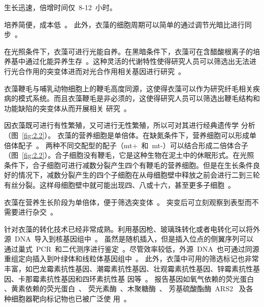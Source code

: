 \begin{asparaitem}[\DiamondSolid]
\item 生长迅速，倍增时间仅\ 8-12\ 小时\citep{Blaby2014}。

\item 培养简便，成本低\ \citep{Sager1953,Harris1989,Flowers2015}。 此外，衣藻的细胞周期可以简单的通过调节光暗比进行同步\ \citep{Blaby2014,Hlavova2016}。

\item 在光照条件下，衣藻可进行光能自养。在黑暗条件下，衣藻可在含醋酸根离子的培养基中通过化能异养生存\ \citep{Blaby2014,Flowers2015}。这种灵活的代谢特性使得研究人员可以筛选出无法进行光合作用的突变体进而对光合作用相关基因进行研究\ \citep{Jinkerson2015}。

\item 衣藻鞭毛与哺乳动物细胞上的鞭毛高度同源，这使得衣藻可以作为研究纤毛相关疾病的模式系统。而且衣藻鞭毛是非必须的，这使得研究人员可以筛选出鞭毛结构和功能缺陷的突变体从而开展相关
    研究\ \citep{Blaby2014}。

\item 因衣藻既可进行有性繁殖，又可进行无性繁殖，所以可对其进行经典遗传学
    分析\ \citep{Kates1964,Flowers2015} （图\ \ref{fig:2.2}）。 衣藻的营养细胞是单倍体。在缺氮条件下，营养细胞可以形成单倍体配子\ \citep{Gallaher2015}。 两种不同交配型的配子（mt+\ 和\ mt-）可以结合形成二倍体合子（图\ \ref{fig:2.2}）。合子细胞没有鞭毛，它是这种生物在泥土中的休眠形式。在光照条件下，合子细胞可进行减数分裂产生四个有鞭毛的营养细胞。但是在生长条件良好的情况下，减数分裂产生的四个子细胞在从母细胞壁中释放之前会进行二到三轮有丝分裂。这样母细胞壁中就可能出现四、八或十六，甚至更多子细胞\ \citep{Jinkerson2015}。

\item 衣藻在营养生长阶段为单倍体，便于筛选突变体\ \citep{Avasthi2013,Li2016}。 突变后可立刻观察到表型而不需要进行杂交\ \citep{Jinkerson2015,Mussgnug2015}。

\item 针对衣藻的转化技术已经非常成熟。利用基因枪、玻璃珠转化或者电转化可以将外源\ DNA\ 导入到核基因组中\
    \citep{Jinkerson2015,Mussgnug2015,Kang2015,Neupert2009,Yamano2013}。 虽然是随机插入，但是插入位点的侧翼序列可以通过巢式\ PCR\ 和二代测序进行鉴定\
    \citep{Gonzalez-Ballester2011,Primers2007,Zhang2014,Li2016,Cheng2017}。尽管效率较低，外源\ DNA\ 也可通过同源重组定向插入到叶绿体和线粒体基因组中\ \citep{Kindle1990,Shimogawara1998}。 此外，衣藻中可用的筛选标记也非常丰富，如巴龙霉素抗性基因、潮霉素抗性基因、壮观霉素抗性基因、锌霉素抗性基因、卡那霉素抗性基因和四环素抗性基
    因等\ \citep{Mussgnug2015,Garcia-Echauri2015,Cerutti1997,Barahimipour2016}。 报告基因如氧气依赖的荧光蛋白\
\citep{Shaner2013,Harris2016,Ormo1996,Fuhrmann1999,Franklin2002,Hakkila2003,Heim1995,Phillips2001,Prasher1992,Onishi2016,Rasala2014,Lauersen2015}
    、黄素依赖的荧光蛋白\ \citep{Mukherjee2015}、 荧光素酶\
    \citep{Minko1999,Shao2008,Fuhrmann2004,Lauersen2013}、木聚糖酶\ \citep{Rasala2012}、 芳基硫酸酯酶\ ARS2\ \citep{Specht2014} 及各种细胞器靶向标记物也已被广泛使
    用\ \citep{Minko1999,Lauersen2015,Rasala2014}。


\end{asparaitem}
